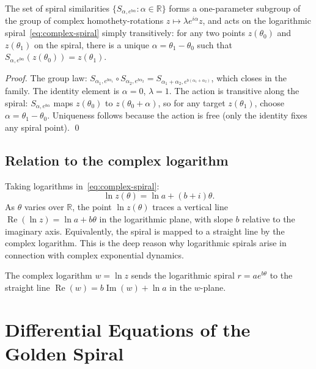 \begin{proposition}
\label{prop:one-param-group}
The set of spiral similarities \(\{S_{\alpha,e^{b\alpha}}: \alpha \in \mathbb{R}\}\)
forms a one-parameter subgroup of the group of complex
homothety-rotations \(z \mapsto \lambda e^{i\alpha} z\), and
acts on the logarithmic spiral~\eqref{eq:complex-spiral} simply
transitively: for any two points \(z(\theta_0)\) and
\(z(\theta_1)\) on the spiral, there is a unique
\(\alpha = \theta_1 - \theta_0\) such that
\(S_{\alpha, e^{b\alpha}}(z(\theta_0)) = z(\theta_1)\).
\end{proposition}

\begin{proof}
The group law: \(S_{\alpha_1, e^{b\alpha_1}} \circ S_{\alpha_2, e^{b\alpha_2}}
= S_{\alpha_1+\alpha_2, e^{b(\alpha_1+\alpha_2)}}\), which closes
in the family.  The identity element is \(\alpha = 0\), \(\lambda = 1\).
The action is transitive along the spiral: \(S_{\alpha,e^{b\alpha}}\)
maps \(z(\theta_0)\) to \(z(\theta_0 + \alpha)\), so for any
target \(z(\theta_1)\), choose \(\alpha = \theta_1 - \theta_0\).
Uniqueness follows because the action is free (only the identity
fixes any spiral point).
\qed
\end{proof}

\subsection{Relation to the complex logarithm}
\label{subsec:17-log}

Taking logarithms in~\eqref{eq:complex-spiral}:
\[
  \ln z(\theta) = \ln a + (b+i)\theta.
\]
As \(\theta\) varies over \(\mathbb{R}\), the point
\(\ln z(\theta)\) traces a vertical line \(\operatorname{Re}(\ln z) = \ln a + b\theta\)
in the logarithmic plane, with slope \(b\) relative to the
imaginary axis.  Equivalently, the spiral is mapped to a straight
line by the complex logarithm.  This is the deep reason why
logarithmic spirals arise in connection with complex exponential
dynamics.

\begin{corollary}
The complex logarithm \(w = \ln z\) sends the logarithmic spiral
\(r = ae^{b\theta}\) to the straight line
\(\operatorname{Re}(w) = b\operatorname{Im}(w) + \ln a\) in the
\(w\)-plane.
\end{corollary}

\section{Differential Equations of the Golden Spiral}
\label{sec:17-odes}

